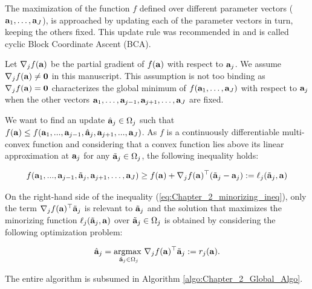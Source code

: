 \documentclass[
]{jss}
\begin{document}
The maximization of the function \(f\) defined over different parameter
vectors (\(\mathbf{a}_1, \ldots,\mathbf{a}_J\)), is approached by updating each of
the parameter vectors in turn, keeping the others fixed. This update
rule was recommended in \citep{DeLeeuw1994} and is called cyclic Block
Coordinate Ascent (BCA).

Let \(\nabla_j f(\mathbf{a})\) be the partial gradient of \(f(\mathbf{a})\) with
respect to \(\mathbf{a}_j\). We assume \(\nabla_j f(\mathbf{a}) \neq \mathbf{0}\)
in this manuscript. This assumption is not too binding as
\(\nabla_j f(\mathbf{a}) = \mathbf{0}\) characterizes the global minimum of
\(f(\mathbf{a}_1 , \ldots , \mathbf{a}_J )\) with respect to \(\mathbf{a}_j\) when the
other vectors
\(\mathbf{a}_1 , \ldots , \mathbf{a}_{j-1} , \mathbf{a}_{j+1} , \ldots , \mathbf{a}_J\) are
fixed.

We want to find an update \(\hat{\mathbf{a}}_j\in \Omega_j\) such that
\(f(\mathbf{a})\leq f(\mathbf{a}_1, ..., \mathbf{a}_{j-1}, \hat{\mathbf{a}}_j, \mathbf{a}_{j+1}, ..., \mathbf{a}_J)\).
As \(f\) is a continuously differentiable multi-convex function and
considering that a convex function lies above its linear approximation
at \(\mathbf{a}_j\) for any \(\tilde{\mathbf{a}}_j\in\Omega_j\), the following
inequality holds:

\begin{equation}
\begin{gathered}
f(\mathbf{a}_1, ..., \mathbf{a}_{j-1}, \tilde{\mathbf{a}}_j, \mathbf{a}_{j+1}, \ldots, \mathbf{a}_J) \geq f(\mathbf{a}) + \nabla_jf(\mathbf{a})^\top(\tilde{\mathbf{a}}_j - \mathbf{a}_j) := \ell_j(\tilde{\mathbf{a}}_j, \mathbf{a})
\label{eq:Chapter_2_minorizing_ineq}
\end{gathered}
\end{equation}

On the right-hand side of the inequality
(\ref{eq:Chapter_2_minorizing_ineq}), only the term
\(\nabla_jf(\mathbf{a})^\top\tilde{\mathbf{a}}_j\) is relevant to
\(\tilde{\mathbf{a}}_j\) and the solution that maximizes the minorizing
function \(\ell_j(\tilde{\mathbf{a}}_j, \mathbf{a})\) over
\(\tilde{\mathbf{a}}_j\in\Omega_j\) is obtained by considering the following
optimization problem:

\begin{equation}
\hat{\mathbf{a}}_j = \underset{\tilde{\mathbf{a}}_j\in\Omega_j}{\mathrm{argmax~}} \nabla_j f(\mathbf{a})^\top \tilde{\mathbf{a}}_j := r_j(\mathbf{a}).
\label{eq:Chapter_2_core_updtae}
\end{equation}

The entire algorithm is subsumed in Algorithm
\ref{algo:Chapter_2_Global_Algo}.
\end{document}

